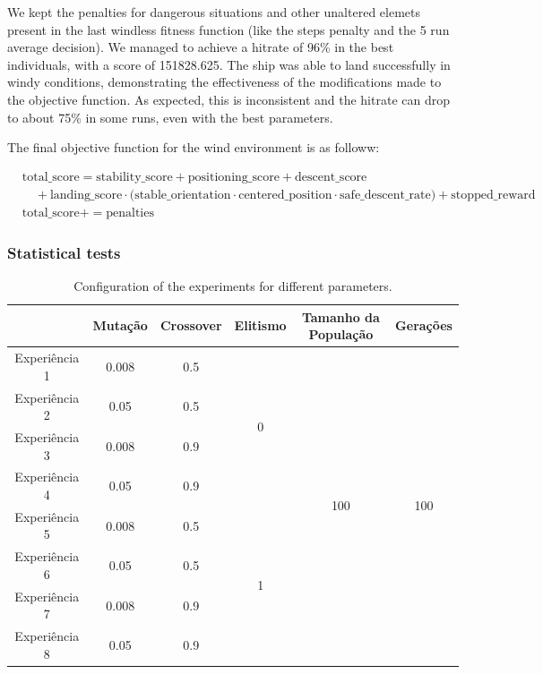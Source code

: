 \documentclass[a4paper, 12pt, fleqn]{report}
\begin{document}
\noindent
We kept the penalties for dangerous situations and other unaltered elemets present in the last windless fitness function (like the steps penalty and the 5 run average decision). We managed to achieve a hitrate of 96\% in the best individuals, with a score of 151828.625. The ship was able to land successfully in windy conditions, demonstrating the effectiveness of the modifications made to the objective function.
As expected, this is inconsistent and the hitrate can drop to about 75\% in some runs, even with the best parameters.

\noindent
The final objective function for the wind environment is as followw:

{\scriptsize
\begin{align*}
    & \text{total\_score} = 
        \text{stability\_score} +
        \text{positioning\_score} +
        \text{descent\_score} \\
    & \quad +
        \text{landing\_score} \cdot
        \big(
            \text{stable\_orientation} \cdot
            \text{centered\_position} \cdot
            \text{safe\_descent\_rate}
        \big) +
        \text{stopped\_reward} \\[0.5em]
    & \text{total\_score} += \text{penalties}
\end{align*}
}


\subsubsection*{Statistical tests}


\begin{table}[H]
    \centering
    \begin{tabular}{|c|c|c|c|c|c|}
    \hline
    \textbf{} & \textbf{Mutação} & \textbf{Crossover} & \textbf{Elitismo} & \textbf{Tamanho da População} & \textbf{Gerações} \\
    \hline
    Experiência 1 & 0.008 & 0.5 & \multirow{4}{*}{0} & \multirow{8}{*}{100} & \multirow{8}{*}{100} \\
    \cline{1-3}
    Experiência 2 & 0.05 & 0.5 &  &  &  \\
    \cline{1-3}
    Experiência 3 & 0.008 & 0.9 &  &  &  \\
    \cline{1-3}
    Experiência 4 & 0.05 & 0.9 &  &  &  \\
    \cline{1-4}
    Experiência 5 & 0.008 & 0.5 & \multirow{4}{*}{1} &  &  \\
    \cline{1-3}
    Experiência 6 & 0.05 & 0.5 &  &  &  \\
    \cline{1-3}
    Experiência 7 & 0.008 & 0.9 &  &  &  \\
    \cline{1-3}
    Experiência 8 & 0.05 & 0.9 &  &  &  \\
    \hline
    \end{tabular}
    \caption{Configuration of the experiments for different parameters.}
    \end{table}
\end{document}
